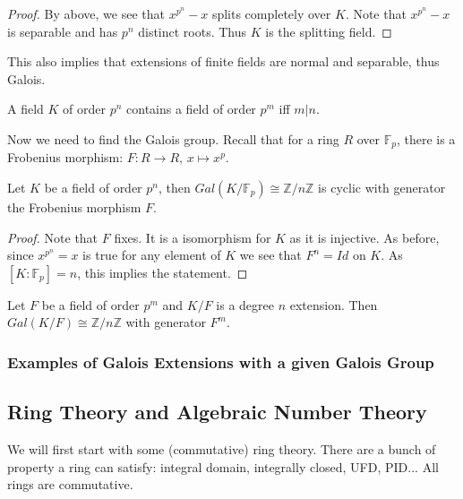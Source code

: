 \documentclass[main.tex]{subfiles}
\begin{document}
\begin{proof}
By above, we see that $x^{p^n} -x$ splits completely over $K$. Note that $x^{p^n} -x$ is separable and has $p^n$ distinct roots. Thus $K$ is the splitting field.
\end{proof}

This also implies that extensions of finite fields are normal and separable, thus Galois.

A field $K$ of order $p^n$ contains a field of order $p^m$ iff $m | n$. 

Now we need to find the Galois group. Recall that for a ring $R$ over $\mathbb{F}_p$, there is a Frobenius morphism: $F : R \rightarrow R$, $x \mapsto x^p$.

\begin{theorem}
Let $K$ be a field of order $p^n$, then $Gal(K/\mathbb{F}_p) \cong \mathbb{Z}/n\mathbb{Z}$ is cyclic with generator the Frobenius morphism $F$.
\end{theorem}

\begin{proof}
Note that $F$ fixes. It is a isomorphism for $K$ as it is injective. As before, since $x^{p^n} = x$ is true for any element of $K$ we see that $F^n = Id$ on $K$. As $[K : \mathbb{F}_p] = n$, this implies the statement.
\end{proof}

\begin{corollary}
Let $F$ be a field of order $p^m$ and $K/F$ is a degree $n$ extension. Then $Gal(K/F) \cong \mathbb{Z}/n\mathbb{Z}$ with generator $F^m$. 
\end{corollary}


\subsubsection{Examples of Galois Extensions with a given Galois Group}


\subsection{Ring Theory and Algebraic Number Theory}

We will first start with some (commutative) ring theory. There are a bunch of property a ring can satisfy: integral domain, integrally closed, UFD, PID... All rings are commutative.
\end{document}
